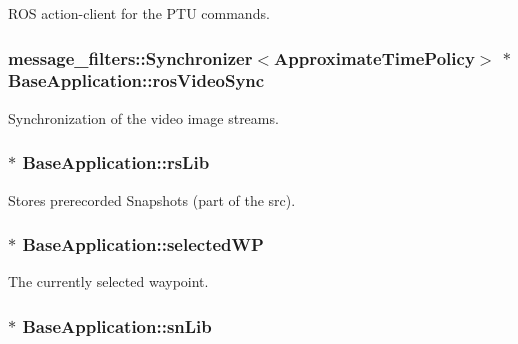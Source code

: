 \-R\-O\-S action-\/client for the \-P\-T\-U commands. \hypertarget{classBaseApplication_a40d9d7bce284716b4f58e5ebf596104b}{
\subsubsection[{ros\-Video\-Sync}]{\setlength{\rightskip}{0pt plus 5cm}message\-\_\-filters\-::\-Synchronizer$<$\-Approximate\-Time\-Policy$>$ $\ast$ {\bf \-Base\-Application\-::ros\-Video\-Sync}}}\label{classBaseApplication_a40d9d7bce284716b4f58e5ebf596104b}
\-Synchronization of the video image streams. \hypertarget{classBaseApplication_a804cbbaeae6ea76b47fce0692460451b}{
\subsubsection[{rs\-Lib}]{ $\ast$ {\bf \-Base\-Application\-::rs\-Lib}}}\label{classBaseApplication_a804cbbaeae6ea76b47fce0692460451b}
\-Stores prerecorded \-Snapshots (part of the src). \hypertarget{classBaseApplication_a1f77aab5b657f16b4aa44200cf12d662}{
\subsubsection[{selected\-W\-P}]{$\ast$ {\bf \-Base\-Application\-::selected\-W\-P}}}\label{classBaseApplication_a1f77aab5b657f16b4aa44200cf12d662}
\-The currently selected waypoint. \hypertarget{classBaseApplication_a51cd2f82fb21d523d6940f5f557b2dff}{
\subsubsection[{sn\-Lib}]{$\ast$ {\bf \-Base\-Application\-::sn\-Lib}}}\label{classBaseApplication_a51cd2f82fb21d523d6940f5f557b2dff}
